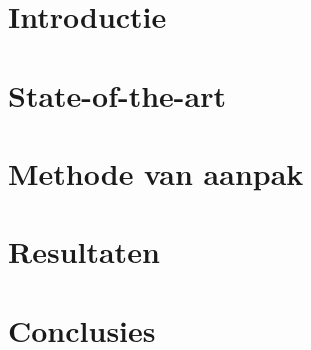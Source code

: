 \documentclass[fleqn,10pt]{voorstel}
\begin{document}
\flushbottom %

\maketitle %

\tableofcontents %

\thispagestyle{empty} %


\section{Introductie} %



\section{State-of-the-art}



\section{Methode van aanpak} \label{sec-moa}


\section{Resultaten}


\section{Conclusies}





\end{document}
